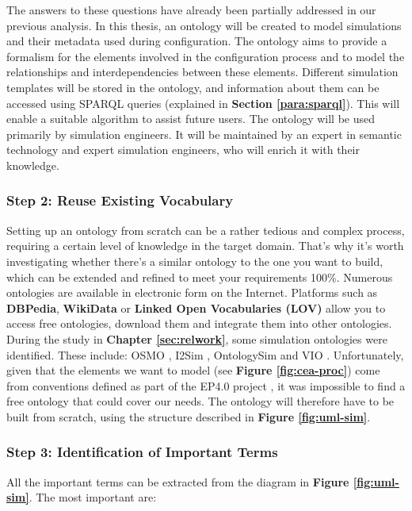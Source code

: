     The answers to these questions have already been partially addressed in our previous analysis. In this thesis, an ontology will be created to model simulations and their metadata used during configuration. The ontology aims to provide a formalism for the elements involved in the configuration process and to model the relationships and interdependencies between these elements. Different simulation templates will be stored in the ontology, and information about them can be accessed using SPARQL queries (explained in \textbf{Section \ref{para:sparql}}). This will enable a suitable algorithm to assist future users. The ontology will be used primarily by simulation engineers. It will be maintained by an expert in semantic technology and expert simulation engineers, who will enrich it with their knowledge.

    
    \subsubsection{Step 2: Reuse Existing Vocabulary}
    Setting up an ontology from scratch can be a rather tedious and complex process, requiring a certain level of knowledge in the target domain. That's why it's worth investigating whether there's a similar ontology to the one you want to build, which can be extended and refined to meet your requirements 100\%. Numerous ontologies are available in electronic form on the Internet. Platforms such as \textbf{DBPedia}, \textbf{WikiData} or \textbf{Linked Open Vocabularies (LOV)} allow you to access free ontologies, download them and integrate them into other ontologies.\\
    
    During the study in \textbf{Chapter \ref{sec:relwork}}, some simulation ontologies were identified. These include: OSMO \cite{horsch2021osmo}, I2Sim \cite{grolinger2012ontology}, OntologySim \cite{may2022ontology} and VIO \cite{spelten2023simulation}. Unfortunately, given that the elements we want to model (see \textbf{Figure \ref{fig:cea-proc}}) come from conventions defined as part of the EP4.0 project \cite{assistSim}, it was impossible to find a free ontology that could cover our needs. The ontology will therefore have to be built from scratch, using the structure described in \textbf{Figure \ref{fig:uml-sim}}.


    \subsubsection{Step 3: Identification of Important Terms}
    All the important terms can be extracted from the diagram in \textbf{Figure \ref{fig:uml-sim}}. The most important are:
    
